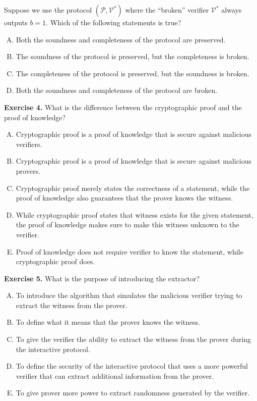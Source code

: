 \documentclass[../lecture-notes.tex]{subfiles}
\begin{document}
Suppose we use the protocol $(\mathcal{P}, \mathcal{V}^*)$ where the ``broken'' verifier $\mathcal{V}^*$ always outputs $b=1$. Which of the following statements is true?
\begin{enumerate}[(A)]
    \item Both the soundness and completeness of the protocol are preserved.
    \item The soundness of the protocol is preserved, but the completeness is broken.
    \item The completeness of the protocol is preserved, but the soundness is broken.
    \item Both the soundness and completeness of the protocol are broken.
\end{enumerate}

\textbf{Exercise 4.} What is the difference between the cryptographic proof and the proof of knowledge?
\begin{enumerate}[(A)]
    \item Cryptographic proof is a proof of knowledge that is secure against malicious verifiers.
    \item Cryptographic proof is a proof of knowledge that is secure against malicious provers.
    \item Cryptographic proof merely states the correctness of a statement, while the proof of knowledge also guarantees that the prover knows the witness.
    \item While cryptographic proof states that witness exists for the given statement, the proof of knowledge makes sure to make this witness unknown to the verifier.
    \item Proof of knowledge does not require verifier to know the statement, while cryptographic proof does.
\end{enumerate}

\textbf{Exercise 5.} What is the purpose of introducing the extractor?
\begin{enumerate}[(A)]
    \item To introduce the algorithm that simulates the malicious verifier trying to extract the witness from the prover.
    \item To define what it means that the prover knows the witness.
    \item To give the verifier the ability to extract the witness from the prover during the interactive protocol.
    \item To define the security of the interactive protocol that uses a more powerful verifier that can extract additional information from the prover.
    \item To give prover more power to extract randomness generated by the verifier.
\end{enumerate}
\end{document}
